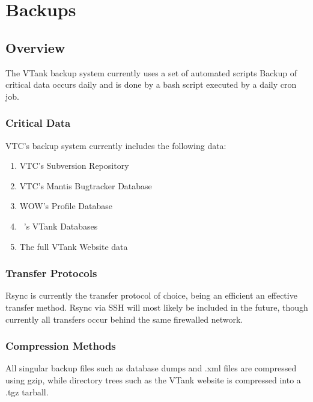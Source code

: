 %

\chapter{Backups}
\section{Overview}
The VTank backup system currently uses a set of automated scripts  Backup of critical data occurs daily and is done by a bash script executed by a daily cron job.

\subsection{Critical Data}
VTC's backup system currently includes the following data:

\begin{enumerate}
\item VTC's Subversion Repository
\item VTC's Mantis Bugtracker Database
\item WOW's Profile Database
\item \MainServer\ 's VTank Databases
\item The full VTank Website data
\end{enumerate}

\subsection{Transfer Protocols}
Rsync is currently the transfer protocol of choice, being an efficient an effective transfer method.  Rsync via SSH will most likely be included in the future, though currently all transfers occur behind the same firewalled network.

\subsection{Compression Methods}
All singular backup files such as database dumps and .xml files are compressed using gzip, while directory trees such as the VTank website is compressed into a .tgz tarball.

